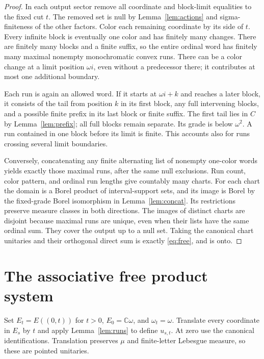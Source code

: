 \documentclass[11pt]{article}
\theoremstyle{remark}\newtheorem{remark}[theorem]{Remark}
\newcommand{\C}{\mathbb C}\newcommand{\F}{\mathcal F}
\newcommand{\vac}{\omega}\newcommand{\fp}{\mathbin{\circledast}}
\begin{document}
\begin{proof}
In each output sector remove all coordinate and block-limit equalities to the
fixed cut $t$. The removed set is null by Lemma~\ref{lem:actions} and
sigma-finiteness of the other factors. Color each remaining coordinate by its
side of $t$. Every infinite block is eventually one color and has finitely many
changes. There are finitely many blocks and a finite suffix, so the entire
ordinal word has finitely many maximal nonempty monochromatic convex runs.
There can be a color change at a limit position $\omega i$, even without a
predecessor there; it contributes at most one additional boundary.

Each run is again an allowed word. If it starts at $\omega i+k$ and reaches
a later block, it consists of the tail from position $k$ in its first block,
any full intervening blocks, and a possible finite prefix in its last block or
finite suffix. The first tail lies in $C$ by Lemma~\ref{lem:prefix}; all full
blocks remain separate. Its grade is below $\omega^2$. A run contained in one
block before its limit is finite. This accounts also for runs crossing several
limit boundaries.

Conversely, concatenating any finite alternating list of nonempty one-color
words yields exactly those maximal runs, after the same null exclusions.
Run count, color pattern, and ordinal run lengths give countably many charts.
For each chart the domain is a Borel product of interval-support sets, and its
image is Borel by the fixed-grade Borel isomorphism in
Lemma~\ref{lem:concat}. Its restrictions preserve measure classes in both
directions. The images of distinct charts are disjoint because maximal runs
are unique, even when their lists have the same ordinal sum. They cover the
output up to a null set. Taking the canonical chart unitaries and their
orthogonal direct sum is exactly \eqref{eq:free}, and is onto.
\end{proof}

\section{The associative free product system}\label{sec:system}

Set $E_t=E((0,t))$ for $t>0$, $E_0=\C\vac$, and $\vac_t=\vac$.
Translate every coordinate in $E_s$ by $t$ and apply
Lemma~\ref{lem:runs} to define $u_{s,t}$. At zero use the canonical
identifications. Translation preserves $\mu$ and finite-letter Lebesgue
measure, so these are pointed unitaries.
\end{document}
